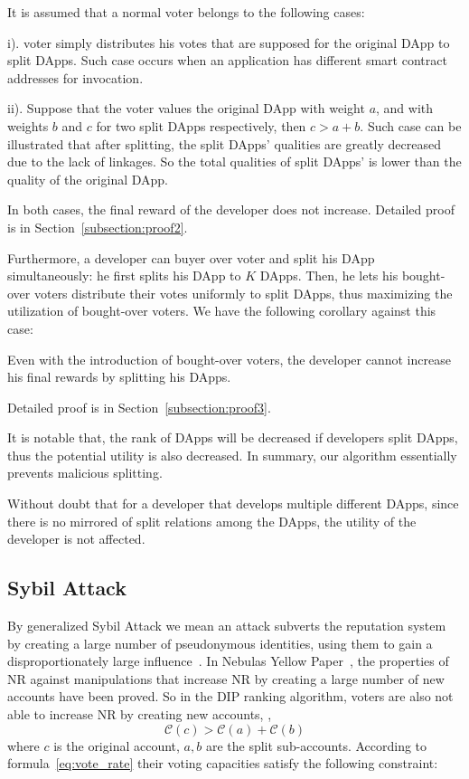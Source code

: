 It is assumed that a normal voter belongs to the following cases:
\begin{inparaenum}
\item[i).] voter simply distributes his votes that are supposed for the original DApp to split DApps. Such case occurs when an application has different smart contract addresses for invocation.
\item[ii).] Suppose that the voter values the original DApp with weight $a$, and with weights $b$ and $c$ for two split DApps respectively, then $c>a+b$. Such case can be illustrated that after splitting, the split DApps' qualities are greatly decreased due to the lack of linkages. So the total qualities of split DApps' is lower than the quality of the original DApp.
 \end{inparaenum}

  In both cases, the final reward of the developer does not increase. Detailed
  proof is in Section~\ref{subsection:proof2}.

Furthermore, a developer can buyer over voter and split his DApp simultaneously: he first splits his DApp to $K$ DApps. Then, he lets his bought-over voters distribute their votes uniformly to split DApps, thus  maximizing the utilization of  bought-over  voters. We have the following corollary against this case:

\begin{corollary}
	\label{c1}
	Even with the introduction of bought-over voters, the developer cannot increase his final rewards by splitting his DApps.
\end{corollary}

Detailed proof is in Section~\ref{subsection:proof3}.

It is notable that, the rank of DApps will be decreased if developers split DApps, thus the potential utility is also decreased. In summary, our algorithm essentially prevents malicious splitting.

Without doubt that for a developer that develops multiple different  DApps,
since there is no mirrored of split relations among the DApps, the utility of
the developer is not affected.

\subsection{Sybil Attack}
\noindent By generalized Sybil Attack we mean an attack subverts the reputation system by creating a large number of pseudonymous identities, using them to gain a disproportionately large influence~\cite{quercia2010sybil}. In Nebulas Yellow Paper~\cite{Nebulasyellowpaper}, the properties of NR against manipulations that increase NR by creating a large number of new accounts have been proved. So in the DIP ranking algorithm, voters are also not able to increase NR by creating new accounts, \ie,
$$\mathcal{C}(c)>\mathcal{C}(a)+\mathcal{C}(b)$$
where $c$ is the original account, $a,b$ are the split sub-accounts. According to formula~\ref{eq:vote_rate} their voting capacities satisfy the following constraint:

